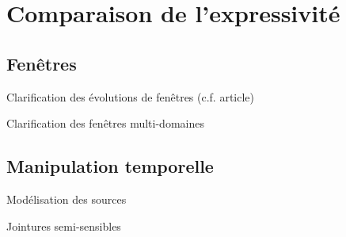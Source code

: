\section{Comparaison de l'expressivité}
\subsection{Fenêtres}
Clarification des évolutions de fenêtres (c.f. article)

Clarification des fenêtres multi-domaines

\subsection{Manipulation temporelle}
Modélisation des sources

Jointures semi-sensibles